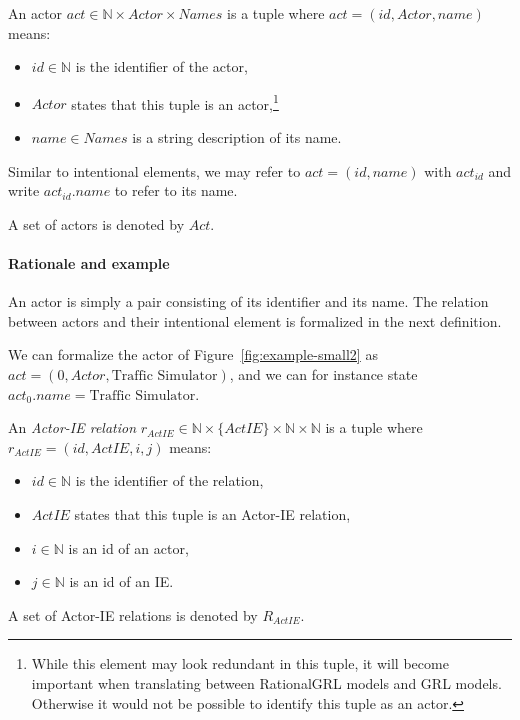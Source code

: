 \begin{definition}[Actor]
\label{def:actor}
An actor $act \in \mathbb{N}\times {Actor}\times Names$ is a tuple where $act=(id,Actor, name)$ means:
\begin{itemize}
\item $id\in\mathbb{N}$ is the identifier of the actor, 
\item $Actor$ states that this tuple is an actor,\footnote{While this element may look redundant in this tuple, it will become important when translating between RationalGRL models and GRL models. Otherwise it would not be possible to identify this tuple as an actor.}
\item $name\in Names$ is a string description of its name.
\end{itemize}

Similar to intentional elements, we may refer to $act = (id,name)$ with $act_{id}$ and write $act_{id}.name$ to refer to its name.

A set of actors is denoted by $Act$.
\end{definition}

\paragraph{Rationale and example} An actor is simply a pair consisting of its identifier and its name. The relation between actors and their intentional element is formalized in the next definition. 

We can formalize the actor of Figure~\ref{fig:example-small2} as $act=(0,Actor,\text{Traffic Simulator})$, and we can for instance state $act_0.name = \text{Traffic Simulator}$.

\begin{definition}
\label{def:act-ie-relation}
An \emph{Actor-IE relation} $r_{ActIE}\in\mathbb{N}\times\{ActIE\}\times\mathbb{N}\times\mathbb{N}$ is a tuple where $r_{ActIE}=(id,ActIE, i, j)$ means:
\begin{itemize}
\item $id\in\mathbb{N}$ is the identifier of the relation, 
\item $ActIE$ states that this tuple is an Actor-IE relation,
\item $i\in\mathbb{N}$ is an id of an actor,
\item $j\in\mathbb{N}$ is an id of an IE.
\end{itemize}

A set of Actor-IE relations is denoted by $R_{ActIE}$.
\end{definition}

